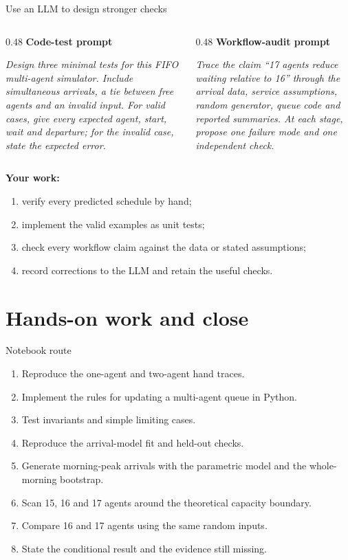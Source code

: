 \documentclass{beamer}
\begin{document}
\begin{frame}{Use an LLM to design stronger checks}
  \footnotesize
  \begin{columns}[T,onlytextwidth]
    \begin{column}{0.48\textwidth}
      \textbf{Code-test prompt}

      \emph{Design three minimal tests for this FIFO multi-agent simulator.
      Include simultaneous arrivals, a tie between free agents and an invalid
      input. For valid cases, give every expected agent, start, wait and
      departure; for the invalid case, state the expected error.}
    \end{column}
    \begin{column}{0.48\textwidth}
      \textbf{Workflow-audit prompt}

      \emph{Trace the claim ``17 agents reduce waiting relative to 16'' through
      the arrival data, service assumptions, random generator, queue code and
      reported summaries. At each stage, propose one failure mode and one
      independent check.}
    \end{column}
  \end{columns}

  \vspace{0.8em}
  \textbf{Your work:}
  \begin{enumerate}
    \item verify every predicted schedule by hand;
    \item implement the valid examples as unit tests;
    \item check every workflow claim against the data or stated assumptions;
    \item record corrections to the LLM and retain the useful checks.
  \end{enumerate}
\end{frame}

\section{Hands-on work and close}

\begin{frame}{Notebook route}
  \begin{enumerate}
    \item Reproduce the one-agent and two-agent hand traces.
    \item Implement the rules for updating a multi-agent queue in Python.
    \item Test invariants and simple limiting cases.
    \item Reproduce the arrival-model fit and held-out checks.
    \item Generate morning-peak arrivals with the parametric model and the whole-morning bootstrap.
    \item Scan 15, 16 and 17 agents around the theoretical capacity boundary.
    \item Compare 16 and 17 agents using the same random inputs.
    \item State the conditional result and the evidence still missing.
  \end{enumerate}
\end{frame}
\end{document}
